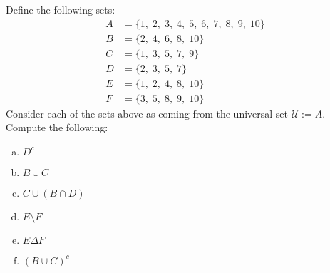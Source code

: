 \documentclass[11pt,letterpaper]{article}
\begin{document}
\sol
{}



\newpage



 Define the following sets:
	\[
	\begin{aligned}
	A&= \{ 1, \; 2, \; 3, \; 4, \; 5, \; 6, \; 7, \; 8, \; 9, \; 10 \} \\
	B&= \{ 2, \; 4, \; 6 , \; 8, \; 10 \} \\
	C&= \{ 1, \; 3, \; 5, \; 7, \; 9 \} \\
	D&= \{ 2, \; 3, \; 5, \; 7 \} \\
	E&= \{ 1, \; 2, \; 4 , \; 8, \; 10 \} \\
	F&= \{ 3, \; 5, \; 8 , \; 9 , \; 10 \}
	\end{aligned}
	\]
Consider each of the sets above as coming from the universal set $:= A$. Compute the following:
	\begin{enumerate}[(a)]
	\item $D^c$
	\item $B \cup C$
	\item $C \cup (B \cap D)$
	\item $E \setminus F$
	\item $E \Delta F$
	\item $(B \cup C)^c$
	\end{enumerate} \pspace
\end{document}
